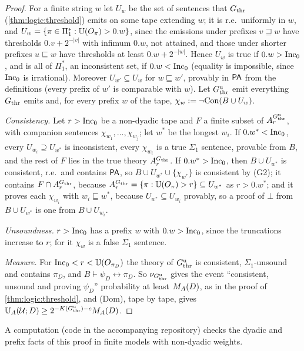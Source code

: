 \begin{proof}
For a finite string $w$ let $U_w$ be the set of sentences that $G_{\mathrm{thr}}$ (\cref{thm:logic:threshold}) emits on some tape extending $w$; it is r.e.\ uniformly in $w$, and $U_w=\{\pi\in\Pi_1^*:\mathbb{U}(O_\pi)>0.w\}$, since the emissions under prefixes $v\sqsupseteq w$ have thresholds $0.v+2^{-\lvert v\rvert}$ with infimum $0.w$, not attained, and those under shorter prefixes $u\sqsubseteq w$ have thresholds at least $0.w+2^{-\lvert w\rvert}$. Hence $U_w$ is true if $0.w>\mathrm{Inc}_0$, and is all of $\Pi_1^*$, an inconsistent set, if $0.w<\mathrm{Inc}_0$ (equality is impossible, since $\mathrm{Inc}_0$ is irrational). Moreover $U_{w'}\subseteq U_w$ for $w\sqsubseteq w'$, provably in $\mathsf{PA}$ from the definitions (every prefix of $w'$ is comparable with $w$). Let $G_{\mathrm{thr}}^{\mathrm u}$ emit everything $G_{\mathrm{thr}}$ emits and, for every prefix $w$ of the tape, $\chi_w:=\neg\mathrm{Con}(B\cup U_w)$.

\emph{Consistency.} Let $r>\mathrm{Inc}_0$ be a non-dyadic tape and $F$ a finite subset of $A^{G_{\mathrm{thr}}^{\mathrm u}}_r$, with companion sentences $\chi_{w_1},\dots,\chi_{w_j}$; let $w^*$ be the longest $w_i$. If $0.w^*<\mathrm{Inc}_0$, every $U_{w_i}\supseteq U_{w^*}$ is inconsistent, every $\chi_{w_i}$ is a true $\Sigma_1$ sentence, provable from $B$, and the rest of $F$ lies in the true theory $A^{G_{\mathrm{thr}}}_r$. If $0.w^*>\mathrm{Inc}_0$, then $B\cup U_{w^*}$ is consistent, r.e.\ and contains $\mathsf{PA}$, so $B\cup U_{w^*}\cup\{\chi_{w^*}\}$ is consistent by (G2); it contains $F\cap A^{G_{\mathrm{thr}}}_r$, because $A^{G_{\mathrm{thr}}}_r=\{\pi:\mathbb{U}(O_\pi)>r\}\subseteq U_{w^*}$ as $r>0.w^*$; and it proves each $\chi_{w_i}$ with $w_i\sqsubseteq w^*$, because $U_{w^*}\subseteq U_{w_i}$ provably, so a proof of $\bot$ from $B\cup U_{w^*}$ is one from $B\cup U_{w_i}$.

\emph{Unsoundness.} $r>\mathrm{Inc}_0$ has a prefix $w$ with $0.w>\mathrm{Inc}_0$, since the truncations increase to $r$; for it $\chi_w$ is a false $\Sigma_1$ sentence.

\emph{Measure.} For $\mathrm{Inc}_0<r<\mathbb{U}(O_{\pi_D})$ the theory of $G_{\mathrm{thr}}^{\mathrm u}$ is consistent, $\Sigma_1$-unsound and contains $\pi_D$, and $B\vdash\psi_D\leftrightarrow\pi_D$. So $\nu_{G_{\mathrm{thr}}^{\mathrm u}}$ gives the event ``consistent, unsound and proving $\psi_D$'' probability at least $M_{A}(D)$, as in the proof of \cref{thm:logic:threshold}, and (Dom), tape by tape, gives $\mathbb{U}_{A}(\mathcal U;D)\ge2^{-K(G_{\mathrm{thr}}^{\mathrm u})-c}M_{A}(D)$.
\end{proof}

A computation (code in the accompanying repository) checks the dyadic and prefix facts of this proof in finite models with non-dyadic weights.

